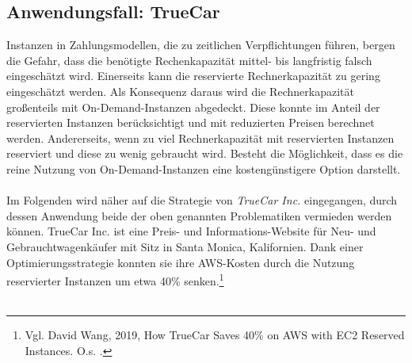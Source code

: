 \subsection{Anwendungsfall: TrueCar}\label{ssec:UseCaseTrueCar}
Instanzen in Zahlungsmodellen, die zu zeitlichen Verpflichtungen führen, bergen die Gefahr, dass die benötigte Rechenkapazität mittel- bis langfristig falsch eingeschätzt wird. Einerseits kann die reservierte Rechnerkapazität zu gering eingeschätzt werden. Als Konsequenz daraus wird die Rechnerkapazität großenteils mit On-Demand-Instanzen abgedeckt. Diese konnte im Anteil der reservierten Instanzen berücksichtigt und mit reduzierten Preisen berechnet werden. Andererseits, wenn zu viel Rechnerkapazität mit reservierten Instanzen reserviert und diese zu wenig gebraucht wird. Besteht die Möglichkeit, dass es die reine Nutzung von On-Demand-Instanzen eine kostengünstigere Option darstellt.
\\\\
Im Folgenden wird näher auf die Strategie von \textit{TrueCar Inc.} eingegangen, durch dessen Anwendung beide der oben genannten Problematiken vermieden werden können.  
TrueCar Inc. ist eine Preis- und Informations-Website für Neu- und Gebrauchtwagenkäufer mit Sitz in Santa Monica, Kalifornien.%
Dank einer Optimierungsstrategie konnten sie ihre AWS-Kosten durch die Nutzung reservierter Instanzen um etwa 40\% senken.\footnote{Vgl. David Wang, 2019, How TrueCar Saves 40\% on AWS with EC2 Reserved Instances. O.s. \cite{MED1}.}
\\\\
